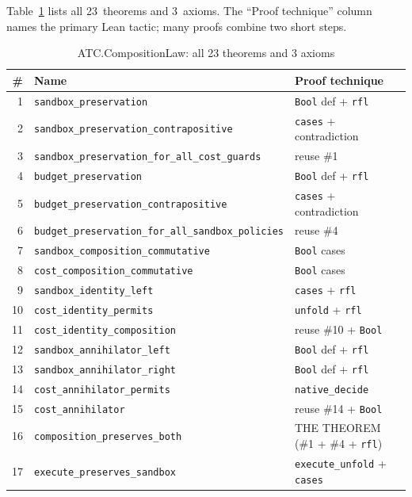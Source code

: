 \documentclass[sigconf]{acmart}
\begin{document}
Table~\ref{tab:theorems} lists all 23~theorems and 3~axioms.  The ``Proof
technique'' column names the primary Lean tactic; many proofs combine two
short steps.

\begin{table}[t]
\caption{ATC.CompositionLaw: all 23 theorems and 3 axioms}
\label{tab:theorems}
\small
\begin{tabular}{rll}
\toprule
\# & Name & Proof technique \\
\midrule
1  & \texttt{sandbox\_preservation}                      & \texttt{Bool} def + \texttt{rfl} \\
2  & \texttt{sandbox\_preservation\_contrapositive}      & \texttt{cases} + contradiction \\
3  & \texttt{sandbox\_preservation\_for\_all\_cost\_guards} & reuse \#1 \\
4  & \texttt{budget\_preservation}                       & \texttt{Bool} def + \texttt{rfl} \\
5  & \texttt{budget\_preservation\_contrapositive}       & \texttt{cases} + contradiction \\
6  & \texttt{budget\_preservation\_for\_all\_sandbox\_policies} & reuse \#4 \\
7  & \texttt{sandbox\_composition\_commutative}          & \texttt{Bool} cases \\
8  & \texttt{cost\_composition\_commutative}             & \texttt{Bool} cases \\
9  & \texttt{sandbox\_identity\_left}                    & \texttt{cases} + \texttt{rfl} \\
10 & \texttt{cost\_identity\_permits}                    & \texttt{unfold} + \texttt{rfl} \\
11 & \texttt{cost\_identity\_composition}                & reuse \#10 + \texttt{Bool} \\
12 & \texttt{sandbox\_annihilator\_left}                 & \texttt{Bool} def + \texttt{rfl} \\
13 & \texttt{sandbox\_annihilator\_right}                & \texttt{Bool} def + \texttt{rfl} \\
14 & \texttt{cost\_annihilator\_permits}                 & \texttt{native\_decide} \\
15 & \texttt{cost\_annihilator}                          & reuse \#14 + \texttt{Bool} \\
16 & \texttt{composition\_preserves\_both}               & THE THEOREM (\#1 + \#4 + \texttt{rfl}) \\
17 & \texttt{execute\_preserves\_sandbox}                & \texttt{execute\_unfold} + \texttt{cases} \\

\end{tabular}
\end{table}
\end{document}
